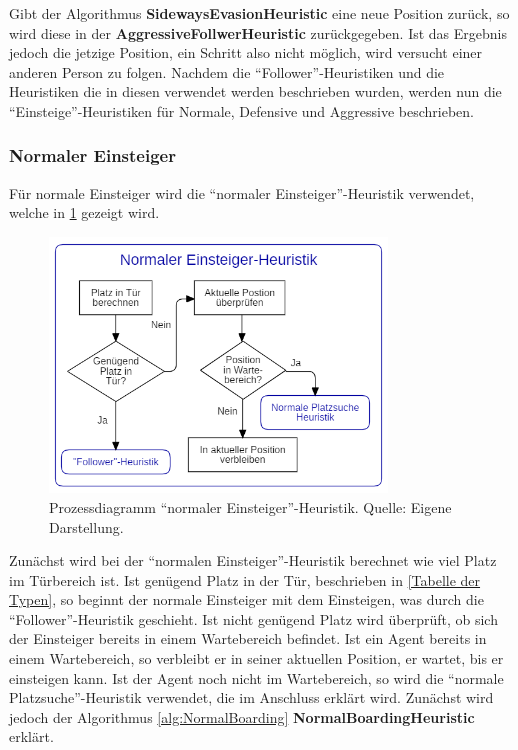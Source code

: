 Gibt der Algorithmus \textbf{SidewaysEvasionHeuristic} eine neue Position zurück, so wird diese in der \textbf{AggressiveFollwerHeuristic} zurückgegeben. Ist das Ergebnis jedoch die jetzige Position, ein Schritt also nicht möglich, wird versucht einer anderen Person zu folgen.
Nachdem die "`Follower"'-Heuristiken und die Heuristiken die in diesen verwendet werden beschrieben wurden, werden nun die "`Einsteige"'-Heuristiken für Normale, Defensive und Aggressive beschrieben.

\subsubsection{Normaler Einsteiger} 
Für normale Einsteiger wird die "`normaler Einsteiger"'-Heuristik verwendet, welche in \figurename \ref{fig:NEH} gezeigt wird.
\begin{figure}[H]
	\centering
		\includegraphics[width=0.8\textwidth]{pictures/model/algorithm/boarding/normal_boarding/normal_boarding_heuristic.png}
	\caption{Prozessdiagramm "`normaler Einsteiger"'-Heuristik. Quelle: Eigene Darstellung.}
	\label{fig:NEH}
\end{figure}
Zunächst wird bei der "`normalen Einsteiger"'-Heuristik berechnet wie viel Platz im Türbereich ist. Ist genügend Platz in der Tür, beschrieben in \ref{Tabelle der Typen}, so beginnt der normale Einsteiger mit dem Einsteigen, was durch die "`Follower"'-Heuristik geschieht. Ist nicht genügend Platz wird überprüft, ob sich der Einsteiger bereits in einem Wartebereich befindet. Ist ein Agent bereits in einem Wartebereich, so verbleibt er in seiner aktuellen Position, er wartet, bis er einsteigen kann. Ist der Agent noch nicht im Wartebereich, so wird die "`normale Platzsuche"'-Heuristik verwendet, die im Anschluss erklärt wird. Zunächst wird jedoch der Algorithmus \ref{alg:NormalBoarding} \textbf{NormalBoardingHeuristic} erklärt. 
\clearpage

